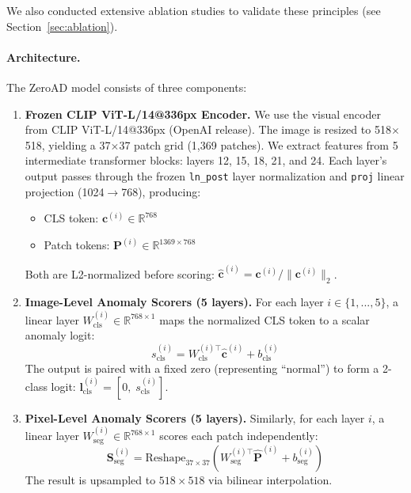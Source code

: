 \documentclass[10pt,twocolumn,letterpaper]{article}
\begin{document}
We also conducted extensive ablation studies to validate these principles (see Section~\ref{sec:ablation}).

\paragraph{Architecture.}
The ZeroAD model consists of three components:

\begin{enumerate}[nosep]
  \item \textbf{Frozen CLIP ViT-L/14@336px Encoder.} We use the visual encoder from CLIP ViT-L/14@336px (OpenAI release). The image is resized to 518$\times$518, yielding a 37$\times$37 patch grid (1,369 patches). We extract features from 5 intermediate transformer blocks: layers 12, 15, 18, 21, and 24. Each layer's output passes through the frozen \texttt{ln\_post} layer normalization and \texttt{proj} linear projection (1024$\to$768), producing:
  \begin{itemize}[nosep]
    \item CLS token: $\mathbf{c}^{(i)} \in \mathbb{R}^{768}$
    \item Patch tokens: $\mathbf{P}^{(i)} \in \mathbb{R}^{1369 \times 768}$
  \end{itemize}
  Both are L2-normalized before scoring: $\hat{\mathbf{c}}^{(i)} = \mathbf{c}^{(i)} / \|\mathbf{c}^{(i)}\|_2$.

  \item \textbf{Image-Level Anomaly Scorers (5 layers).} For each layer $i \in \{1,...,5\}$, a linear layer $W_{\text{cls}}^{(i)} \in \mathbb{R}^{768 \times 1}$ maps the normalized CLS token to a scalar anomaly logit:
  \begin{equation}
    s_{\text{cls}}^{(i)} = W_{\text{cls}}^{(i)\top} \hat{\mathbf{c}}^{(i)} + b_{\text{cls}}^{(i)}
  \end{equation}
  The output is paired with a fixed zero (representing ``normal'') to form a 2-class logit: $\mathbf{l}_{\text{cls}}^{(i)} = [0,\; s_{\text{cls}}^{(i)}]$.

  \item \textbf{Pixel-Level Anomaly Scorers (5 layers).} Similarly, for each layer $i$, a linear layer $W_{\text{seg}}^{(i)} \in \mathbb{R}^{768 \times 1}$ scores each patch independently:
  \begin{equation}
    \mathbf{S}_{\text{seg}}^{(i)} = \text{Reshape}_{37 \times 37}\!\left(W_{\text{seg}}^{(i)\top} \hat{\mathbf{P}}^{(i)} + b_{\text{seg}}^{(i)}\right)
  \end{equation}
  The result is upsampled to $518 \times 518$ via bilinear interpolation.
\end{enumerate}
\end{document}
